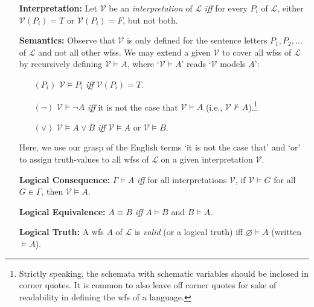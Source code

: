 \documentclass[a4paper, 11pt]{article} %
\begin{document}
\begin{enumerate}[leftmargin=1.2in,labelsep=.15in]
\item[\bf Interpretation:] Let $\mathcal{V}$ be an \textit{interpretation} of $\mathcal{L}$ \textit{iff} for every $P_i$ of $\mathcal{L}$, either $\mathcal{V}(P_i)=T$ or $\mathcal{V}(P_i)=F$, but not both.
\item[\bf Semantics:] Observe that $\mathcal{V}$ is only defined for the sentence letters $P_1,P_2,\dots$ of $\mathcal{L}$ and not all other wfss. We may extend a given $\mathcal{V}$ to cover all wfss of $\mathcal{L}$ by recursively defining $\mathcal{V}\vDash A$, where `$\mathcal{V}\vDash A$' reads `$\mathcal{V}$ models $A$':
\begin{small}
\begin{itemize}[leftmargin=.36in]
\item[$(P_i)$] $\mathcal{V}\vDash P_i$ \textit{iff} $\mathcal{V}(P_i)=T$.
\item[$(\neg)$] $\mathcal{V}\vDash \neg A$ \textit{iff} it is not the case that $\mathcal{V}\vDash A$ (i.e., $\mathcal{V}\nvDash A$).\footnote{Strictly speaking, the schemata with schematic variables should be inclosed in corner quotes. It is common to also leave off corner quotes for sake of readability in defining the wfs of a language.}
\item[$(\vee)$] $\mathcal{V}\vDash A\vee B$ \textit{iff} $\mathcal{V}\vDash A$ or $\mathcal{V}\vDash B$.
\end{itemize}
\end{small}
Here, we use our grasp of the English terms `it is not the case that' and `or' to assign truth-values to all wfss of $\mathcal{L}$ on a given interpretation $\mathcal{V}$. 
\item[\bf Logical Consequence:] $\Gamma\vDash A$ \textit{iff} for all interpretations $\mathcal{V}$, if $\mathcal{V}\vDash G$ for all $G\in\Gamma$, then $\mathcal{V}\vDash A$.
\item[\bf Logical Equivalence:] $A\equiv B$ \textit{iff} $A\vDash B$ and $B\vDash A$.  
\item[\bf Logical Truth:] A wfs $A$ of $\mathcal{L}$ is \textit{valid} (or a logical truth) iff $\varnothing\vDash A$ (written $\vDash A$).
\end{enumerate}
\end{document}
